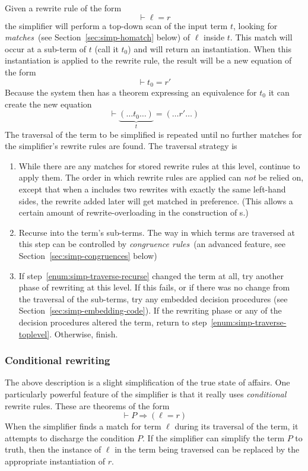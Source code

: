 {Given a rewrite rule of the form \[
\vdash \ell = r
\]
the simplifier will perform a top-down scan of the input term $t$,
looking for \emph{matches}~(see Section~\ref{sec:simp-homatch} below)
of $\ell$ inside $t$.  This match will occur at a sub-term of $t$
(call it $t_0$) and will return an instantiation.  When this
instantiation is applied to the rewrite rule, the result will be a new
equation of the form \[
\vdash t_0 = r'
\]
Because the system then has a theorem expressing an equivalence for
$t_0$ it can create the new equation \[
  \vdash \underbrace{(\dots t_0\dots)}_t = (\dots r' \dots)
\]
The traversal of the term to be simplified is repeated until no
further matches for the simplifier's rewrite rules are found.  The
traversal strategy is
\begin{enumerate}
\item \label{enum:simp-traverse-toplevel}%
  While there are any matches for stored rewrite rules at this level,
  continue to apply them.  The order in which rewrite rules are
  applied can \emph{not} be relied on, except that when a \simpset{}
  includes two rewrites with exactly the same left-hand sides, the
  rewrite added later will get matched in preference.  (This allows a
  certain amount of rewrite-overloading in the construction of
  \simpset{}s.)
\item \label{enum:simp-traverse-recurse}%
  Recurse into the term's sub-terms.  The way in which terms are
  traversed at this step can be controlled by \emph{congruence
    rules}~(an advanced feature, see Section~\ref{sec:simp-congruences}
  below)
\item If step~\ref{enum:simp-traverse-recurse} changed the term at
  all, try another phase of rewriting at this level.  If this fails,
  or if there was no change from the traversal of the sub-terms, try
  any embedded decision procedures (see
  Section~\ref{sec:simp-embedding-code}).  If the rewriting phase or
  any of the decision procedures altered the term, return to
  step~\ref{enum:simp-traverse-toplevel}.  Otherwise, finish.
\end{enumerate}

\subsubsection{Conditional rewriting}

The above description is a slight simplification of the true state of
affairs.  One particularly powerful feature of the simplifier is that
it really uses \emph{conditional} rewrite rules.  These are theorems
of the form
\[
\vdash P \Rightarrow (\ell = r)
\]
When the simplifier finds a match for term $\ell$ during its traversal
of the term, it attempts to discharge the condition $P$.  If the
simplifier can simplify the term $P$ to truth, then the instance of
$\ell$ in the term being traversed can be replaced by the appropriate
instantiation of $r$.

}

